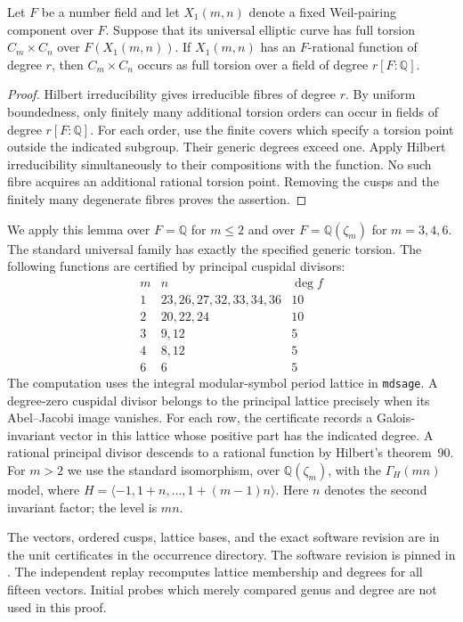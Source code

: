 \begin{lemma}\label{lem:hilbert}
Let $F$ be a number field and let $X_1(m,n)$ denote a fixed Weil-pairing
component over $F$. Suppose that its universal elliptic curve has full
torsion $C_m\times C_n$ over $F(X_1(m,n))$. If $X_1(m,n)$ has an
$F$-rational function of degree $r$, then $C_m\times C_n$ occurs as
full torsion over a field of degree $r[F:\mathbb Q]$.
\end{lemma}
\begin{proof}
Hilbert irreducibility gives irreducible fibres of degree $r$.
By uniform boundedness, only finitely many additional torsion orders
can occur in fields of degree $r[F:\mathbb Q]$. For each order, use
the finite covers which specify a torsion point outside the indicated
subgroup. Their generic degrees exceed one. Apply Hilbert irreducibility
simultaneously to their compositions with the function. No such fibre
acquires an additional rational torsion point. Removing the cusps and
the finitely many degenerate fibres proves the assertion.
\end{proof}

We apply this lemma over $F=\mathbb Q$ for $m\leq2$ and over
$F=\mathbb Q(\zeta_m)$ for $m=3,4,6$. The standard universal family
has exactly the specified generic torsion. The following functions
are certified by principal cuspidal divisors:
\[
\begin{array}{c|l|c}
m&n&\deg f\\\hline
1&23,26,27,32,33,34,36&10\\
2&20,22,24&10\\
3&9,12&5\\
4&8,12&5\\
6&6&5
\end{array}
\]
The computation uses the integral modular-symbol period lattice in
\texttt{mdsage}. A degree-zero cuspidal divisor belongs to the
principal lattice precisely when its Abel--Jacobi image vanishes.
For each row, the certificate records a Galois-invariant vector in
this lattice whose positive part has the indicated degree. A rational
principal divisor descends to a rational function by Hilbert's theorem~90.
For $m>2$ we use the standard isomorphism, over $\mathbb Q(\zeta_m)$,
with the $\Gamma_H(mn)$ model, where
$H=\langle-1,1+n,\ldots,1+(m-1)n\rangle$.
Here $n$ denotes the second invariant factor; the level is $mn$.

The vectors, ordered cusps, lattice bases, and the exact software revision
are in the unit certificates in the occurrence directory.
The software revision is pinned in . The independent replay recomputes
lattice membership and degrees for all fifteen vectors. Initial probes
which merely compared genus and degree are not used in this proof.
